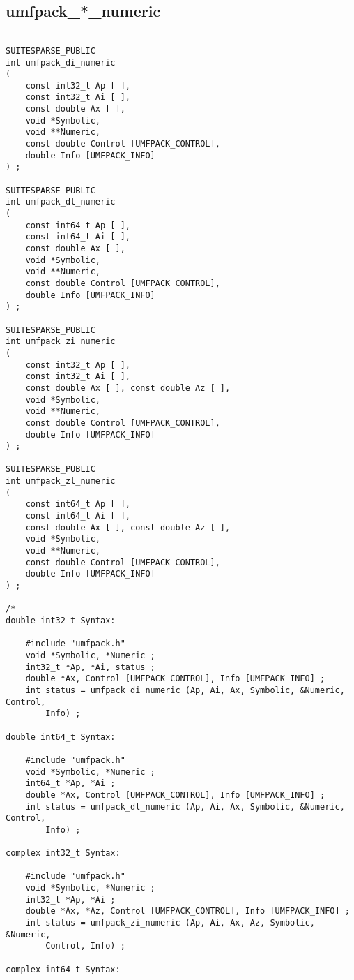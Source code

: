 \documentclass[11pt]{article}
\begin{document}
\newpage
\subsection{umfpack\_*\_numeric}

{\footnotesize
\begin{verbatim}

SUITESPARSE_PUBLIC
int umfpack_di_numeric
(
    const int32_t Ap [ ],
    const int32_t Ai [ ],
    const double Ax [ ],
    void *Symbolic,
    void **Numeric,
    const double Control [UMFPACK_CONTROL],
    double Info [UMFPACK_INFO]
) ;

SUITESPARSE_PUBLIC
int umfpack_dl_numeric
(
    const int64_t Ap [ ],
    const int64_t Ai [ ],
    const double Ax [ ],
    void *Symbolic,
    void **Numeric,
    const double Control [UMFPACK_CONTROL],
    double Info [UMFPACK_INFO]
) ;

SUITESPARSE_PUBLIC
int umfpack_zi_numeric
(
    const int32_t Ap [ ],
    const int32_t Ai [ ],
    const double Ax [ ], const double Az [ ],
    void *Symbolic,
    void **Numeric,
    const double Control [UMFPACK_CONTROL],
    double Info [UMFPACK_INFO]
) ;

SUITESPARSE_PUBLIC
int umfpack_zl_numeric
(
    const int64_t Ap [ ],
    const int64_t Ai [ ],
    const double Ax [ ], const double Az [ ],
    void *Symbolic,
    void **Numeric,
    const double Control [UMFPACK_CONTROL],
    double Info [UMFPACK_INFO]
) ;

/*
double int32_t Syntax:

    #include "umfpack.h"
    void *Symbolic, *Numeric ;
    int32_t *Ap, *Ai, status ;
    double *Ax, Control [UMFPACK_CONTROL], Info [UMFPACK_INFO] ;
    int status = umfpack_di_numeric (Ap, Ai, Ax, Symbolic, &Numeric, Control,
        Info) ;

double int64_t Syntax:

    #include "umfpack.h"
    void *Symbolic, *Numeric ;
    int64_t *Ap, *Ai ;
    double *Ax, Control [UMFPACK_CONTROL], Info [UMFPACK_INFO] ;
    int status = umfpack_dl_numeric (Ap, Ai, Ax, Symbolic, &Numeric, Control,
        Info) ;

complex int32_t Syntax:

    #include "umfpack.h"
    void *Symbolic, *Numeric ;
    int32_t *Ap, *Ai ;
    double *Ax, *Az, Control [UMFPACK_CONTROL], Info [UMFPACK_INFO] ;
    int status = umfpack_zi_numeric (Ap, Ai, Ax, Az, Symbolic, &Numeric,
        Control, Info) ;

complex int64_t Syntax:


\end{verbatim}}
\end{document}
